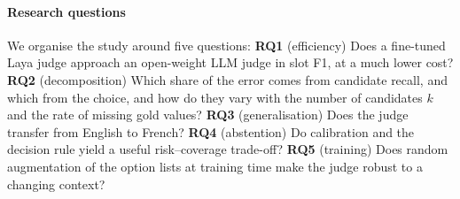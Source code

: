 \paragraph{Research questions} We organise the study around five questions:
\textbf{RQ1} (efficiency) Does a fine-tuned Laya judge approach an open-weight LLM judge in slot F1, at a much lower cost?
\textbf{RQ2} (decomposition) Which share of the error comes from candidate recall, and which from the choice, and how do they vary with the number of candidates $k$ and the rate of missing gold values?
\textbf{RQ3} (generalisation) Does the judge transfer from English to French?
\textbf{RQ4} (abstention) Do calibration and the decision rule yield a useful risk--coverage trade-off?
\textbf{RQ5} (training) Does random augmentation of the option lists at training time make the judge robust to a changing context?

